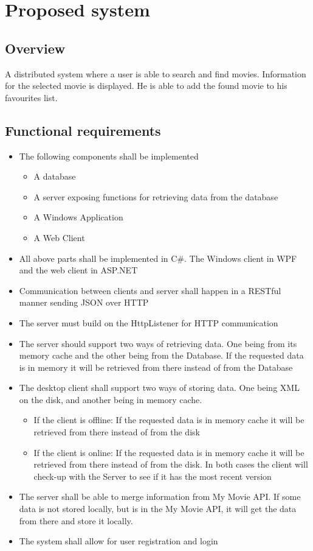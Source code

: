 \chapter{Proposed system}
\label{sec:proposed system}

\section{Overview}
A distributed system where a user is able to search and find movies. Information for the selected movie is displayed. He is able to add the found movie to his favourites list.

\section{Functional requirements}
\begin{itemize}
	\setlength{\itemsep}{-5pt}
	\item The following components shall be implemented
	\begin{itemize}
		\setlength{\itemsep}{-5pt}
		\item A database
		\item A server exposing functions for retrieving data from the database
		\item A Windows Application
		\item A Web Client
	\end{itemize}
	\item All above parts shall be implemented in C\#. The Windows client in WPF and the web client in ASP.NET
	\item Communication between clients and server shall happen in a RESTful manner sending JSON over HTTP
	\item The server must build on the HttpListener for HTTP communication
	\item The server should support two ways of retrieving data. One being from its memory cache and the other being from the Database. If the requested data is in memory it will be retrieved from there instead of from the Database
	\item The desktop client shall support two ways of storing data. One being XML on the disk, and another being in memory cache.
	\begin{itemize}
			\setlength{\itemsep}{-5pt}
			\item If the client is offline: If the requested data is in memory cache it will be retrieved from there instead of from the disk
			\item If the client is online: If the requested data is in memory cache it will be retrieved from there instead of from the disk. In both cases the client will check-up with the Server to see if it has the most recent version
	\end{itemize}
	\item The server shall be able to merge information from My Movie API. If some data is not stored locally, but is in the My Movie API, it will get the data from there and store it locally.
	\item The system shall allow for user registration and login
\end{itemize}

